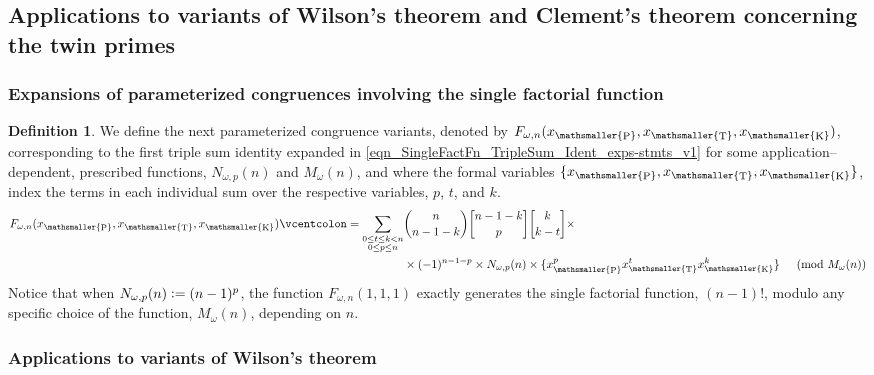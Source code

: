 \documentclass[12pt,reqno]{article}
\numberwithin{sfootnote}{section}
\numberwithin{equation}{section}
\theoremstyle{plain}
\theoremstyle{definition}
\newtheorem{definition}[theorem]{Definition}
\theoremstyle{remark}
\newcommand{\defequals}{\ensuremath{\vcentcolon=}}
\newcommand{\gkpSI}[2]{\ensuremath{\genfrac{\lbrack}{\rbrack}{0pt}{}{#1}{#2}}}
\DeclareMathOperator{\XT}{T}
\DeclareMathOperator{\XK}{K}
\DeclareMathOperator{\XP}{P}
\newcommand{\xt}{x_{\mathsmaller{\XT}}}
\newcommand{\xk}{x_{\mathsmaller{\XK}}}
\newcommand{\xp}{x_{\mathsmaller{\XP}}}
\begin{document}
\subsection{Applications to 
            variants of Wilson's theorem and 
            Clement's theorem concerning the twin primes} 
\label{subsubSection_NewIdentsFromFiniteDiffEqns_ExpsOfPrime-RelatedCongr} 

\subsubsection{Expansions of parameterized congruences 
               involving the single factorial function} 

\begin{definition} 
\label{def_v2} 
We define the next parameterized congruence variants, 
denoted by $F_{\omega,n}(\xp, \xt, \xk)$, 
corresponding to the first triple sum identity expanded in 
\eqref{eqn_SingleFactFn_TripleSum_Ident_exps-stmts_v1} 
for some application--dependent, prescribed functions, 
$N_{\omega,p}(n)$ and $M_{\omega}(n)$, and where the formal variables 
$\{\xp, \xt, \xk\}$, index the terms in each 
individual sum over the respective variables, $p$, $t$, and $k$. 
\begin{align} 
\label{eqn_FwnXpXtXk_RHS_CongruenceFn_def-stmt_v1} 
F_{\omega,n}(\xp, \xt, \xk) \defequals 
     \sum\limits_{\substack{0 \leq t \leq k < n \\ 0 \leq p \leq n}} & 
     \binom{n}{n-1-k} \gkpSI{n-1-k}{p} \gkpSI{k}{k-t} \times && \\ 
\notag 
     & \times 
     (-1)^{n-1-p} \times N_{\omega,p}(n) 
     \times \{\xp^p \xt^t \xk^k\} 
     && \pmod{M_{\omega}(n)} 
\end{align} 
Notice that 
when $N_{\omega,p}(n) \defequals (n-1)^{p}$, the function 
$F_{\omega,n}(1, 1, 1)$ exactly generates the 
single factorial function, $(n-1)!$, modulo any specific choice of the 
function, $M_{\omega}(n)$, depending on $n$. 
\end{definition} 

\subsubsection{Applications 
               to variants of Wilson's theorem} 
\label{subsubSection_TripleSumIdents_App_to_WThm} 
\end{document}
